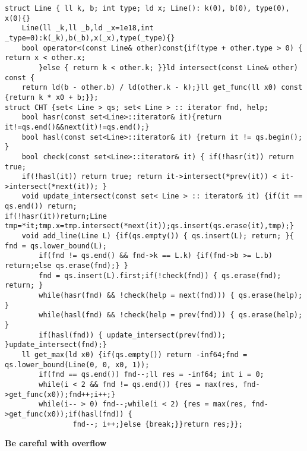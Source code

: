 \documentclass[a4paper,12pt]{article}
\begin{document}
\begin{verbatim}
struct Line { ll k, b; int type; ld x; Line(): k(0), b(0), type(0), x(0){}
    Line(ll _k,ll _b,ld _x=1e18,int _type=0):k(_k),b(_b),x(_x),type(_type){}
    bool operator<(const Line& other)const{if(type + other.type > 0) { return x < other.x;
        }else { return k < other.k; }}ld intersect(const Line& other) const {
    return ld(b - other.b) / ld(other.k - k);}ll get_func(ll x0) const {return k * x0 + b;}};
struct CHT {set< Line > qs; set< Line > :: iterator fnd, help;
    bool hasr(const set<Line>::iterator& it){return it!=qs.end()&&next(it)!=qs.end();}
    bool hasl(const set<Line>::iterator& it) {return it != qs.begin(); }
    bool check(const set<Line>::iterator& it) { if(!hasr(it)) return true;
    if(!hasl(it)) return true; return it->intersect(*prev(it)) < it->intersect(*next(it)); }
    void update_intersect(const set< Line > :: iterator& it) {if(it == qs.end()) return;
if(!hasr(it))return;Line tmp=*it;tmp.x=tmp.intersect(*next(it));qs.insert(qs.erase(it),tmp);}
    void add_line(Line L) {if(qs.empty()) { qs.insert(L); return; }{   fnd = qs.lower_bound(L);
        if(fnd != qs.end() && fnd->k == L.k) {if(fnd->b >= L.b) return;else qs.erase(fnd);} }
        fnd = qs.insert(L).first;if(!check(fnd)) { qs.erase(fnd); return; }
        while(hasr(fnd) && !check(help = next(fnd))) { qs.erase(help); }
        while(hasl(fnd) && !check(help = prev(fnd))) { qs.erase(help); }
        if(hasl(fnd)) { update_intersect(prev(fnd)); }update_intersect(fnd);}
    ll get_max(ld x0) {if(qs.empty()) return -inf64;fnd = qs.lower_bound(Line(0, 0, x0, 1));
        if(fnd == qs.end()) fnd--;ll res = -inf64; int i = 0;
        while(i < 2 && fnd != qs.end()) {res = max(res, fnd->get_func(x0));fnd++;i++;}
        while(i-- > 0) fnd--;while(i < 2) {res = max(res, fnd->get_func(x0));if(hasl(fnd)) {
                fnd--; i++;}else {break;}}return res;}};
\end{verbatim}

{\bf Be careful with overflow}
\end{document}
